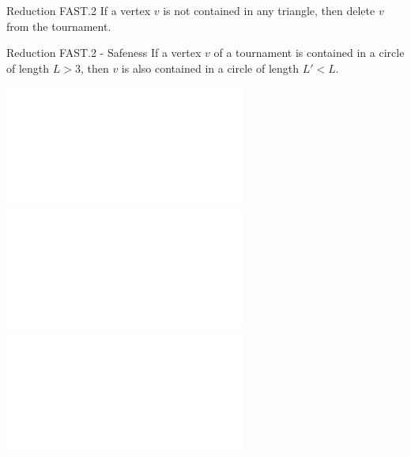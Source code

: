\documentclass{beamer}
\begin{document}
	\begin{frame}[fragile]{Reduction FAST.2}
		If a vertex \(v\) is not contained in any triangle, then delete \(v\) from the tournament.
		\begin{center}
		\end{center}
	\end{frame}
	
	\begin{frame}[fragile]{Reduction FAST.2 - Safeness}
		If a vertex \(v\) of a tournament is contained in a circle of length $L > 3$, then $v$ is also contained in a circle of length $L' < L$.
		\begin{center}
		\includegraphics<1>[height=0.6\paperheight]{images/FAST_2/FAST2_Safeness1.pdf}
		\includegraphics<2>[height=0.6\paperheight]{images/FAST_2/FAST2_Safeness2.pdf} 
		\includegraphics<3>[height=0.6\paperheight]{images/FAST_2/FAST2_Safeness3.pdf} 
		\end{center}
	\end{frame}
	
\end{document}
